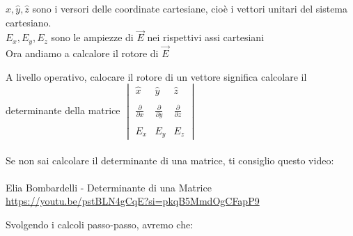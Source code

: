 $\hat{x} , \hat{y} , \hat{z}$ sono i versori delle coordinate cartesiane, cioè i vettori unitari del sistema cartesiano. \\ 
$E_x , E_y , E_z$ sono le ampiezze di $\vec{E}$ nei rispettivi assi cartesiani \\ 


Ora andiamo a calcalore il rotore di $\vec{E}$ 

\begin{tcolorbox}
    A livello operativo, calocare il rotore di un vettore significa calcolare il determinante della matrice 
    $\begin{vmatrix}
        \hat{x} & \hat{y} &\hat{z} \\ \\ 
        \frac{\partial}{\partial x} & \frac{\partial}{\partial y} & \frac{\partial}{\partial z} \\ \\ 
        E_x & E_y & E_z
    \end{vmatrix} $ \\ \\ 

    Se non sai calcolare il determinante di una matrice, ti consiglio questo video: \\ \\ Elia Bombardelli - Determinante di una Matrice  \\ \url{https://youtu.be/pstBLN4gCqE?si=pkqB5MmdOgCFapP9} 
\end{tcolorbox}

Svolgendo i calcoli passo-passo, avremo che: \\ 

